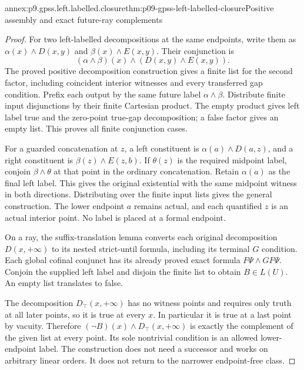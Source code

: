 \begin{annexitem}{annex:p9.gpss.left.labelled.closure}{thm:p09-gpss-left-labelled-closure}{Positive assembly and exact future-ray complements}
\begin{proof}
For two left-labelled decompositions at the same endpoints,
write them as \(\alpha(x)\land D(x,y)\) and
\(\beta(x)\land E(x,y)\). Their conjunction is
\[
           (\alpha\land\beta)(x)\land(D(x,y)\land E(x,y)).
\]
The proved positive decomposition construction gives a finite
list for the second factor, including coincident interior
witnesses and every transferred gap condition. Prefix each
output by the same future label \(\alpha\land\beta\).
Distribute finite input disjunctions by their finite Cartesian
product. The empty product gives left label true and the
zero-point true-gap decomposition; a false factor gives an
empty list. This proves all finite conjunction cases.

For a guarded concatenation at \(z\), a left constituent is
\(\alpha(a)\land D(a,z)\), and a right constituent is
\(\beta(z)\land E(z,b)\). If \(\theta(z)\) is the
required midpoint label, conjoin \(\beta\land\theta\)
at that point in the ordinary concatenation. Retain
\(\alpha(a)\) as the final left label. This gives the
original existential with the same midpoint witness in both
directions. Distributing over the finite input lists gives
the general construction. The lower endpoint \(a\) remains
actual, and each quantified \(z\) is an actual interior
point. No label is placed at a formal endpoint.

On a ray, the suffix-translation lemma converts each original
decomposition \(D(x,+\infty)\) to its nested strict-until
formula, including its terminal \(G\) condition. Each global
cofinal conjunct has its already proved exact formula
\(F\Psi\land GF\Psi\). Conjoin the supplied left label
and disjoin the finite list to obtain \(B\in L(U)\).
An empty list translates to false.

The decomposition \(D_{\top}(x,+\infty)\) has no witness
points and requires only truth at all later points, so it is
true at every \(x\). In particular it is true at a last point
by vacuity. Therefore
\((\neg B)(x)\land D_{\top}(x,+\infty)\) is exactly
the complement of the given list at every point. Its sole
nontrivial condition is an allowed lower-endpoint label.
The construction does not need a successor and works on
arbitrary linear orders. It does not return to the narrower
endpoint-free class.
\end{proof}
\end{annexitem}

